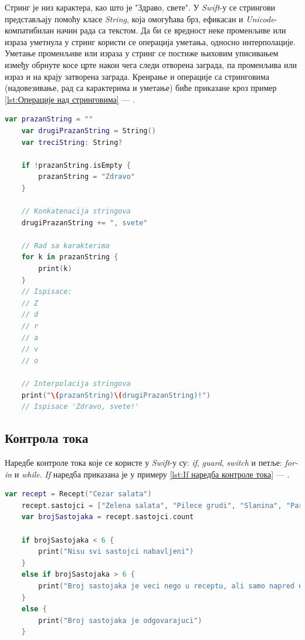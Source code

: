 \documentclass[12pt,oneside]{memoir}
\begin{document}
\indent Стринг је низ карактера, као што је "Здраво, свете". У \textit{Swift}-у се стрингови представљају помоћу класе \textit{String}, која омогућава брз, ефикасан и \textit{Unicode}-компатибилан начин рада са текстом. Да би се вредност неке променљиве или израза уметнула у стринг користи се операција уметања, односно интерполације. Уметање променљиве или израза у стринг се постиже њиховим уписивањем између обрнуте косе црте након чега следи отворена заграда, па променљива или израз и на крају затворена заграда. Креирање и операције са стринговима (надовезивање, рад са карактерима и уметање) биће приказане кроз пример \ref{lst:Операције над стринговима} --- .

\begin{lstlisting}[caption=\textit{{Операције над стринговима}}, label={lst:Операције над стринговима}, language=Swift, frame=single]
    var prazanString = ""
    var drugiPrazanString = String()
    var treciString: String?
    
    if !prazanString.isEmpty {
        prazanString = "Zdravo"
    }
    
    // Konkatenacija stringova
    drugiPrazanString += ", svete"
    
    // Rad sa karakterima
    for k in prazanString {
        print(k)
    }
    // Ispisace: 
    // Z
    // d
    // r
    // a
    // v
    // o
    
    // Interpolacija stringova
    print("\(prazanString)\(drugiPrazanString)!")
    // Ispisace 'Zdravo, svete!'
\end{lstlisting}

\subsection{Контрола тока}
\label{subsec:Контрола тока}

\indent Наредбе контроле тока које се користе у \textit{Swift}-у су: \textit{if}, \textit{guard}, \textit{switch} и петље: \textit{for-in} и \textit{while}. \textit{If} наредба приказана је у примеру \ref{lst:If наредба контроле тока} --- .

\begin{lstlisting}[caption=\textit{{If наредбa контроле тока}}, label={lst:If наредба контроле тока}, language=Swift, frame=single]
    var recept = Recept("Cezar salata")
    recept.sastojci = ["Zelena salata", "Pilece grudi", "Slanina", "Paradajz", "Hleb", "Cezar premaz"]
    var brojSastojaka = recept.sastojci.count
    
    if brojSastojaka < 6 {
        print("Nisu svi sastojci nabavljeni")
    }
    else if brojSastojaka > 6 {
        print("Broj sastojaka je veci nego u receptu, ali samo napred eksperimentisi")
    }
    else {
        print("Broj sastojaka je odgovarajuci")
    }
\end{lstlisting}
\end{document}
